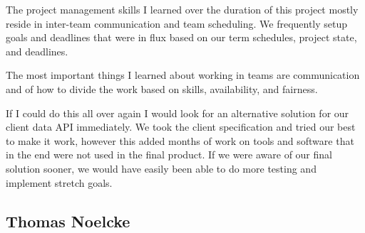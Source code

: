 \documentclass[onecolumn, draftclsnofoot,10pt, compsoc]{article}
\begin{document}
        The project management skills I learned over the duration of this project mostly reside in inter-team communication and team scheduling. We frequently setup goals and deadlines that were in flux based on our term schedules, project state, and deadlines.

        The most important things I learned about working in teams are communication and of how to divide the work based on skills, availability, and fairness.

        If I could do this all over again I would look for an alternative solution for our client data API immediately. We took the client specification and tried our best to make it work, however this added months of work on tools and software that in the end were not used in the final product. If we were aware of our final solution sooner, we would have easily been able to do more testing and implement stretch goals.


    \subsection{Thomas Noelcke}
\end{document}
